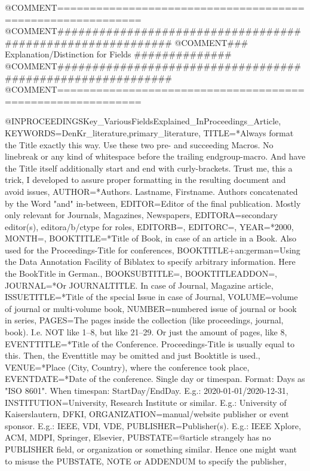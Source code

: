 @COMMENT{===========================================================}
@COMMENT{###########################################################}
@COMMENT{###    Explanation/Distinction for Fields    ##############}
@COMMENT{###########################################################}
@COMMENT{===========================================================}


@INPROCEEDINGS{Key_VariousFieldsExplained_InProceedings_Article,
	KEYWORDS={DenKr_literature,primary_literature},
	TITLE={\begingroup
		{*Always format the Title exactly this way. Use these two pre- and succeeding Macros. No linebreak or any kind of whitespace before the trailing endgroup-macro. And have the Title itself additionally start and end with curly-brackets.
		Trust me, this a trick, I developed to assure proper formatting in the resulting document and avoid issues}\endgroup},
	AUTHOR={*Authors. Lastname, Firstname. Authors concatenated by the Word "and" in-between},
	EDITOR={Editor of the final publication. Mostly only relevant for Journals, Magazines, Newspapers},
	EDITORA={secondary editor(s), editora/b/ctype for roles},
	EDITORB={},
	EDITORC={},
	YEAR={*2000},
	MONTH={},
	BOOKTITLE={*Title of Book, in case of an article in a Book. Also used for the Proceedings-Title for conferences},
	BOOKTITLE+an:german={Using the Data Annotation Facility of Biblatex to specify arbitrary information. Here the BookTitle in German.},
	BOOKSUBTITLE={},
	BOOKTITLEADDON={},
	JOURNAL={*Or JOURNALTITLE. In case of Journal, Magazine article},
	ISSUETITLE={*Title of the special Issue in case of Journal},
	VOLUME={volume of journal or multi-volume book},
	NUMBER={numbered issue of journal or book in series},
	PAGES={The pages inside the collection (like proceedings, journal, book). I.e. NOT like 1--8, but like 21--29. Or just the amount of pages, like 8},
	EVENTTITLE={*Title of the Conference. Proceedings-Title is usually equal to this. Then, the Eventtitle may be omitted and just Booktitle is used.},
	VENUE={*Place (City, Country), where the conference took place},
	EVENTDATE={*Date of the conference. Single day or timespan. Format: Days as "ISO 8601". When timespan: StartDay/EndDay. E.g.: 2020-01-01/2020-12-31},
	INSTITUTION={University, Research Institute or similar. E.g.: University of Kaiserslautern, DFKI},
	ORGANIZATION={manual/website publisher or event sponsor. E.g.: IEEE, VDI, VDE},
	PUBLISHER={Publisher(s). E.g.: IEEE Xplore, ACM, MDPI, Springer, Elsevier},
	PUBSTATE={@article strangely has no PUBLISHER field, or organization or something similar. Hence one might want to misuse the PUBSTATE, NOTE or ADDENDUM to specify the publisher},
}
